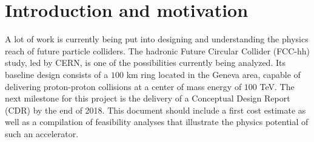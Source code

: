 
\section{Introduction and motivation}
\label{sec:intro}


A lot of work is currently being put into designing and understanding the physics reach of future particle colliders. The hadronic Future Circular Collider (FCC-hh) study, led by CERN, is one of the possibilities currently being analyzed. Its baseline design consists of a $100$ km ring located in the Geneva area, capable of delivering proton-proton collisions at a center of mass energy of $100$ TeV. The next milestone for this project is the delivery of a Conceptual Design Report (CDR) by the end of 2018. This document should include a first cost estimate as well as a compilation of feasibility analyses that illustrate the physics potential of such an accelerator.

